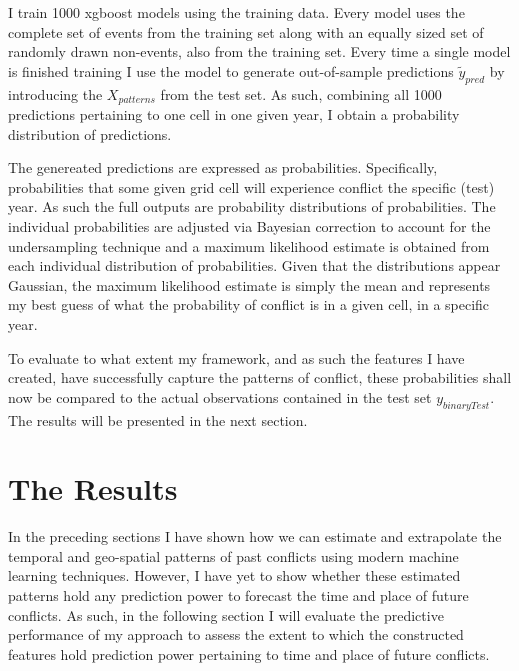 \documentclass[a4paper]{article}
\begin{document}
I train 1000 xgboost models using the training data. Every model uses the complete set of events from the training set along with an equally sized set of randomly drawn non-events, also from the training set. Every time a single model is finished training I use the model to generate out-of-sample predictions $\tilde{y}_{pred}$ by introducing the $X_{patterns}$ from the test set. As such, combining all 1000 predictions pertaining to one cell in one given year, I obtain a probability distribution of predictions. \par


The genereated predictions are expressed as probabilities. Specifically, probabilities that some given grid cell will experience conflict the specific (test) year. As such the full outputs are probability distributions of probabilities. The individual probabilities are adjusted via Bayesian correction to account for the undersampling technique and a maximum likelihood estimate is obtained from each individual distribution of probabilities. Given that the distributions appear Gaussian, the maximum likelihood estimate is simply the mean and represents my best guess of what the probability of conflict is in a given cell, in a specific year.\par 


To evaluate to what extent my framework, and as such the features I have created, have successfully capture the patterns of conflict, these probabilities shall now be compared to the actual observations contained in the test set $y_{binaryTest}$. The results will be presented in the next section.\par

\section{The Results}

In the preceding sections I have shown how we can estimate and extrapolate the temporal and geo-spatial patterns of past conflicts using modern machine learning techniques. However, I have yet to show whether these estimated patterns hold any prediction power to forecast the time and place of future conflicts. As such, in the following section I will evaluate the predictive performance of my approach to assess the extent to which the constructed features hold prediction power pertaining to time and place of future conflicts.\par 
\end{document}
